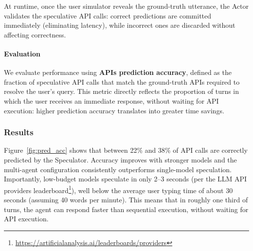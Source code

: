 At runtime, once the user simulator reveals the ground-truth utterance, the Actor validates the speculative API calls: correct predictions are committed immediately (eliminating latency), while incorrect ones are discarded without affecting correctness.
\paragraph{Evaluation} 
We evaluate performance using \textbf{APIs prediction accuracy}, defined as the fraction of speculative API calls that match the ground-truth APIs required to resolve the user’s query. This metric directly reflects the proportion of turns in which the user receives an immediate response, without waiting for API execution: higher prediction accuracy translates into greater time savings. 



\subsubsection{Results}
Figure~\ref{fig:pred_acc} shows that between 22\% and 38\% of API calls are correctly predicted by the Speculator. Accuracy improves with stronger models and the multi-agent configuration consistently outperforms single-model speculation. Importantly, low-budget models speculate in only 2–3 seconds (per the LLM API providers leaderboard\footnote{\url{https://artificialanalysis.ai/leaderboards/providers}}), well below the average user typing time of about 30 seconds (assuming 40 words per minute). This means that in roughly one third of turns, the agent can respond faster than sequential execution, without waiting for API execution. 




